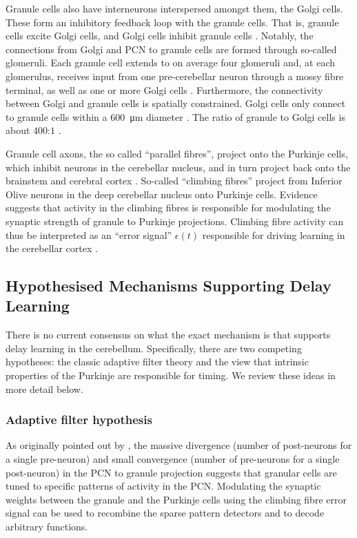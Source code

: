 Granule cells also have interneurons interspersed amongst them, the Golgi cells.
These form an inhibitory feedback loop with the granule cells.
That is, granule cells excite Golgi cells, and Golgi cells inhibit granule cells \citep{ito2010cerebellar}.
Notably, the connections from Golgi and PCN to granule cells are formed through so-called glomeruli.
Each granule cell extends to on average four glomeruli and, at each glomerulus, receives input from one pre-cerebellar neuron through a mossy fibre terminal, as well as one or more Golgi cells \citep{palkovits1972quantitative,jakab1988quantitative,chadderton2004integration}.
Furthermore, the connectivity between Golgi and granule cells is spatially constrained.
Golgi cells only connect to granule cells within a \SI{600}{\micro\metre} diameter \citep{albus1971theory,dangelo2013cerebellar}.
The ratio of granule to Golgi cells is about $400$:$1$ \citep{korbo1993total}.

Granule cell axons, the so called \enquote{parallel fibres}, project onto the Purkinje cells, which inhibit neurons in the cerebellar nucleus, and in turn project back onto the brainstem and cerebral cortex \citep{ito2010cerebellar,llinas2010olivocerebellar}.
So-called \enquote{climbing fibres} project from Inferior Olive neurons in the deep cerebellar nucleus onto Purkinje cells. 
Evidence suggests that activity in the climbing fibres is responsible for modulating the synaptic strength of granule to Purkinje projections.
Climbing fibre activity can thus be interpreted as an \enquote{error signal} $\epsilon(t)$ responsible for driving learning in the cerebellar cortex \citep{ito2010cerebellar}.

\subsection{Hypothesised Mechanisms Supporting Delay Learning}

There is no current consensus on what the exact mechanism is that supports delay learning in the cerebellum.
Specifically, there are two competing hypotheses: the classic adaptive filter theory and the view that intrinsic properties of the Purkinje are responsible for timing.
We review these ideas in more detail below.

\subsubsection{Adaptive filter hypothesis}
As originally pointed out by \citet{marr1969theory,albus1971theory}, the massive divergence (number of post-neurons for a single pre-neuron) and small convergence (number of pre-neurons for a single post-neuron) in the PCN to granule projection suggests that granular cells are tuned to specific patterns of activity in the PCN.
Modulating the synaptic weights between the granule and the Purkinje cells using the climbing fibre error signal can be used to recombine the sparse pattern detectors and to decode arbitrary functions.

